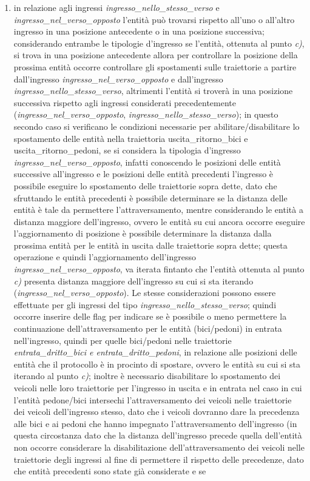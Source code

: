\begin{enumerate}
\begin{enumerate}
\item in relazione agli ingressi \textit{ingres\-so\_nel\-lo\_stes\-so\_ver\-so} e \textit{ingres\-so\_nel\_ver\-so\_op\-pos\-to} l'entità può trovarsi rispetto all'uno o all'altro ingresso in una posizione antecedente o in una posizione successiva; considerando entrambe le tipologie d'ingresso se l'entità, ottenuta al punto \textit{c)}, si trova in una posizione antecedente allora per controllare la posizione della prossima entità occorre controllare gli spostamenti sulle traiettorie a partire dall'ingresso \textit{ingres\-so\_nel\_ver\-so\_op\-pos\-to} e dall'ingresso \textit{ingres\-so\_nel\-lo\_stes\-so\_ver\-so}, altrimenti l'entità si troverà in una posizione successiva rispetto agli ingressi considerati precedentemente (\textit{ingres\-so\_nel\_ver\-so\_op\-pos\-to}, \textit{ingres\-so\_nel\-lo\_stes\-so\_ver\-so}); in questo secondo caso si verificano le condizioni necessarie per abilitare/disabilitare lo spostamento delle entità nella traiettoria usci\-ta\_ri\-tor\-no\_bi\-ci e usci\-ta\_ri\-tor\-no\_pe\-do\-ni, se si considera la tipologia d'ingresso \textit{ingres\-so\_nel\_ver\-so\_op\-pos\-to}, infatti conoscendo le posizioni delle entità successive all'ingresso e le posizioni delle entità precedenti l'ingresso è possibile eseguire lo spostamento delle traiettorie sopra dette, dato che sfruttando le entità precedenti è possibile determinare se la distanza delle entità è tale da permettere l'attraversamento, mentre considerando le entità a distanza maggiore dell'ingresso, ovvero le entità su cui ancora occorre eseguire l'aggiornamento di posizione è possibile determinare la distanza dalla prossima entità per le entità in uscita dalle traiettorie sopra dette; questa operazione e quindi l'aggiornamento dell'ingresso \textit{ingres\-so\_nel\_ver\-so\_op\-pos\-to}, va iterata fintanto che l'entità ottenuta al punto \textit{c)} presenta distanza maggiore dell'ingresso su cui si sta iterando (\textit{ingres\-so\_nel\_ver\-so\_op\-pos\-to}). Le stesse considerazioni possono essere effettuate per gli ingressi del tipo \textit{ingres\-so\_nel\-lo\_stes\-so\_ver\-so}; quindi occorre inserire delle flag per indicare se è possibile o meno permettere la continuazione dell'attraversamento per le entità (bici/pedoni) in entrata nell'ingresso, quindi per quelle bici/pedoni nelle traiettorie \textit{en\-tra\-ta\_drit\-to\_bi\-ci e en\-tra\-ta\_drit\-to\_pe\-do\-ni}, in relazione alle posizioni delle entità che il protocollo è in procinto di spostare, ovvero le entità su cui si sta iterando al punto \textit{c)}; inoltre è necessario disabilitare lo spostamento dei veicoli nelle loro traiettorie per l'ingresso in uscita e in entrata nel caso in cui l'entità pedone/bici intersechi l'attraversamento dei veicoli nelle traiettorie dei veicoli dell'ingresso stesso, dato che i veicoli dovranno dare la precedenza alle bici e ai pedoni che hanno impegnato l'attraversamento dell'ingresso (in questa circostanza dato che la distanza dell'ingresso precede quella dell'entità non occorre considerare la disabilitazione dell'attraversamento dei veicoli nelle traiettorie degli ingressi al fine di permettere il rispetto delle precedenze, dato che entità precedenti sono state già considerate e se 
\end{enumerate}
\end{enumerate}
